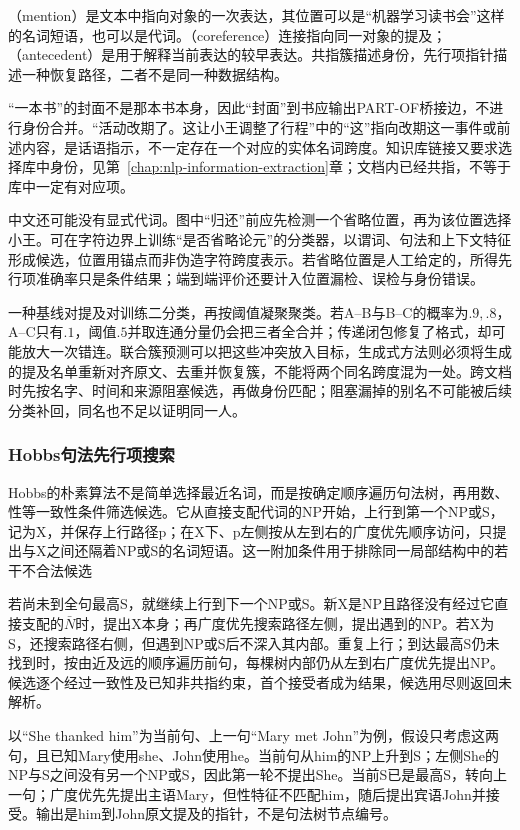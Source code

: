 （mention）是文本中指向对象的一次表达，其位置可以是“机器学习读书会”这样的名词短语，也可以是代词。（coreference）连接指向同一对象的提及；（antecedent）是用于解释当前表达的较早表达。共指簇描述身份，先行项指针描述一种恢复路径，二者不是同一种数据结构。

“一本书”的封面不是那本书本身，因此“封面”到书应输出PART-OF桥接边，不进行身份合并。“活动改期了。这让小王调整了行程”中的“这”指向改期这一事件或前述内容，是话语指示，不一定存在一个对应的实体名词跨度。知识库链接又要求选择库中身份，见第~\ref{chap:nlp-information-extraction}章；文档内已经共指，不等于库中一定有对应项。

中文还可能没有显式代词。图中“归还”前应先检测一个省略位置，再为该位置选择小王。可在字符边界上训练“是否省略论元”的分类器，以谓词、句法和上下文特征形成候选，位置用锚点而非伪造字符跨度表示。若省略位置是人工给定的，所得先行项准确率只是条件结果；端到端评价还要计入位置漏检、误检与身份错误。

一种基线对提及对训练二分类，再按阈值凝聚聚类。若A--B与B--C的概率为$.9,.8$，A--C只有$.1$，阈值$.5$并取连通分量仍会把三者全合并；传递闭包修复了格式，却可能放大一次错连。联合簇预测可以把这些冲突放入目标，生成式方法则必须将生成的提及名单重新对齐原文、去重并恢复簇，不能将两个同名跨度混为一处。跨文档时先按名字、时间和来源阻塞候选，再做身份匹配；阻塞漏掉的别名不可能被后续分类补回，同名也不足以证明同一人。

\subsubsection{Hobbs句法先行项搜索}
\label{sec:nlp-analysis-hobbs}

Hobbs的朴素算法不是简单选择最近名词，而是按确定顺序遍历句法树，再用数、性等一致性条件筛选候选。它从直接支配代词的NP开始，上行到第一个NP或S，记为X，并保存上行路径p；在X下、p左侧按从左到右的广度优先顺序访问，只提出与X之间还隔着NP或S的名词短语。这一附加条件用于排除同一局部结构中的若干不合法候选

若尚未到全句最高S，就继续上行到下一个NP或S。新X是NP且路径没有经过它直接支配的$\bar N$时，提出X本身；再广度优先搜索路径左侧，提出遇到的NP。若X为S，还搜索路径右侧，但遇到NP或S后不深入其内部。重复上行；到达最高S仍未找到时，按由近及远的顺序遍历前句，每棵树内部仍从左到右广度优先提出NP。候选逐个经过一致性及已知非共指约束，首个接受者成为结果，候选用尽则返回未解析。

以“She thanked him”为当前句、上一句“Mary met John”为例，假设只考虑这两句，且已知Mary使用she、John使用he。当前句从him的NP上升到S；左侧She的NP与S之间没有另一个NP或S，因此第一轮不提出She。当前S已是最高S，转向上一句；广度优先先提出主语Mary，但性特征不匹配him，随后提出宾语John并接受。输出是him到John原文提及的指针，不是句法树节点编号。


